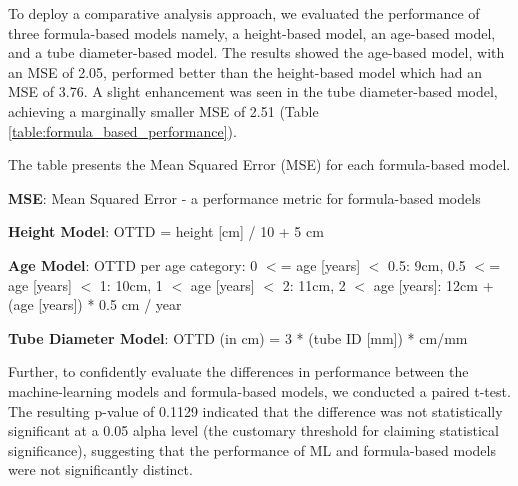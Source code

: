 \documentclass[11pt]{article}
\begin{document}
To deploy a comparative analysis approach, we evaluated the performance of three formula-based models namely, a height-based model, an age-based model, and a tube diameter-based model. The results showed the age-based model, with an MSE of 2.05, performed better than the height-based model which had an MSE of 3.76. A slight enhancement was seen in the tube diameter-based model, achieving a marginally smaller MSE of 2.51 (Table {}\ref{table:formula_based_performance}).

\begin{table}[h]
\caption{Performance metrics for different formula-based models}
\label{table:formula_based_performance}
\begin{threeparttable}
\renewcommand{\TPTminimum}{\linewidth}
\begin{tablenotes}
\footnotesize
\item The table presents the Mean Squared Error (MSE) for each formula-based model.
\item \textbf{MSE}: Mean Squared Error - a performance metric for formula-based models
\item \textbf{Height Model}: OTTD = height [cm] / 10 + 5 cm
\item \textbf{Age Model}: OTTD per age category: 0 $<$= age [years] $<$ 0.5: 9cm, 0.5 $<$= age [years] $<$ 1: 10cm, 1 $<$ age [years] $<$ 2: 11cm, 2 $<$ age [years]: 12cm + (age [years]) * 0.5 cm / year
\item \textbf{Tube Diameter Model}: OTTD (in cm) = 3 * (tube ID [mm]) * cm/mm
\end{tablenotes}
\end{threeparttable}
\end{table}


Further, to confidently evaluate the differences in performance between the machine-learning models and formula-based models, we conducted a paired t-test. The resulting p-value of 0.1129 indicated that the difference was not statistically significant at a 0.05 alpha level (the customary threshold for claiming statistical significance), suggesting that the performance of ML and formula-based models were not significantly distinct.
\end{document}
